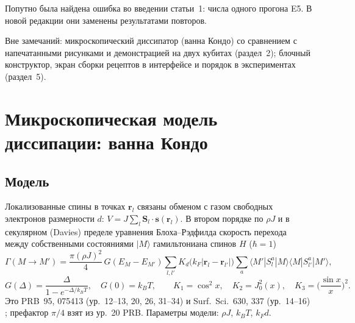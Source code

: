 \documentclass[12pt,a4paper]{article}
\newcommand{\rhoJ}{\rho J}
\newcommand{\kT}{k_BT}
\begin{document}
Попутно была найдена ошибка во введении статьи~1: числа одного прогона E5.
В новой редакции они заменены результатами повторов.

Вне замечаний: микроскопический диссипатор (ванна Кондо) со сравнением с напечатанными рисунками и
демонстрацией на двух кубитах (раздел~2); блочный конструктор, экран сборки рецептов в интерфейсе и
порядок в экспериментах (раздел~5).

\clearpage
\section{Микроскопическая модель диссипации: ванна Кондо}

\subsection{Модель}

Локализованные спины в точках $\mathbf r_l$ связаны обменом с газом свободных электронов
размерности $d$: $V=J\sum_l \mathbf S_l\cdot\mathbf s(\mathbf r_l)$. В
втором порядке по $\rhoJ$ и в секулярном (Davies) пределе уравнения Блоха--Рэдфилда
скорость перехода между собственными состояниями $|M\rangle$ гамильтониана спинов $H$ ($\hbar=1$)
\begin{equation}
\Gamma(M\to M')=\frac{\pi(\rhoJ)^2}{4}\,G(E_M-E_{M'})
\sum_{l,l'}K_d\!\big(k_F|\mathbf r_l-\mathbf r_{l'}|\big)
\sum_a\langle M'|S^a_l|M\rangle\langle M|S^a_{l'}|M'\rangle,
\label{eq:rate}
\end{equation}
\begin{equation}
G(\Delta)=\frac{\Delta}{1-e^{-\Delta/\kT}},\quad G(0)=\kT,\qquad
K_1=\cos^2x,\quad K_2=J_0^2(x),\quad K_3=\Big(\frac{\sin x}{x}\Big)^2 .
\end{equation}
Это PRB~95, 075413 (ур.~12--13, 20, 26, 31--34) и Surf.\ Sci.\ 630, 337 (ур.~14--16)
\cite{delgado2017,delgado2014}; префактор $\pi/4$ взят из ур.~20 PRB. Параметры
модели: $\rhoJ$, $\kT$, $k_Fd$.
\end{document}
